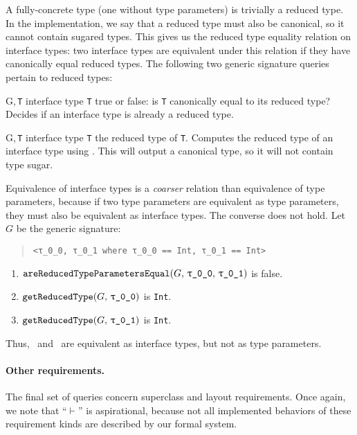 \documentclass[../generics]{subfiles}
\begin{document}
A fully-concrete type (one without type parameters) is trivially a reduced type. In the implementation, we say that a reduced type must also be canonical, so it cannot contain sugared types. This gives us the reduced type equality relation on interface types: two interface types are equivalent under this relation if they have canonically equal reduced types. The following two generic signature queries pertain to reduced types:

\begin{itemize}
{G,\,\texttt{T}}
{interface type \texttt{T}}
{true or false: is \texttt{T} canonically equal to its reduced type?}
{Decides if an interface type is already a reduced type.}

{G,\,\texttt{T}}
{interface type \texttt{T}}
{the reduced type of \texttt{T}.}
{Computes the reduced type of an interface type using . This will output a canonical type, so it will not contain type sugar.}
\end{itemize}

\begin{example}
Equivalence of interface types is a \emph{coarser} relation than equivalence of type parameters, because if two type parameters are equivalent as type parameters, they must also be equivalent as interface types. The converse does not hold. Let~$G$ be the generic signature:
\begin{quote}
\begin{verbatim}
<τ_0_0, τ_0_1 where τ_0_0 == Int, τ_0_1 == Int>
\end{verbatim}
\end{quote}
\begin{enumerate}
\item $\Query{areReducedTypeParametersEqual}{G,\,\rT,\,\rU}$ is false.
\item $\Query{getReducedType}{G,\,\rT}$ is \texttt{Int}.
\item $\Query{getReducedType}{G,\,\rU}$ is \texttt{Int}.
\end{enumerate}
Thus, \rT\ and \rU\ are equivalent as interface types, but not as type parameters.
\end{example}

\paragraph{Other requirements.} The final set of queries concern superclass and layout requirements. Once again, we note that ``$\vdash$'' is aspirational, because not all implemented behaviors of these requirement kinds are described by our formal system.
\end{document}
